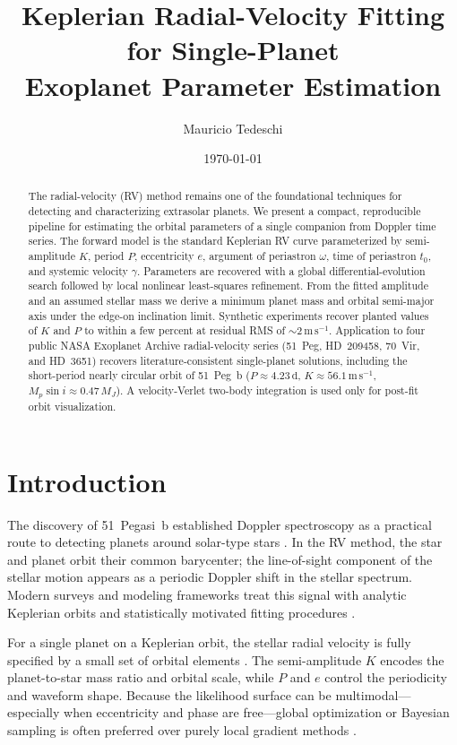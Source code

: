 \documentclass[11pt]{article}
\title{Keplerian Radial-Velocity Fitting for Single-Planet\\
Exoplanet Parameter Estimation}
\author{Mauricio Tedeschi}
\date{\today}
\begin{document}
\maketitle

\begin{abstract}
The radial-velocity (RV) method remains one of the foundational techniques for
detecting and characterizing extrasolar planets. We present a compact,
reproducible pipeline for estimating the orbital parameters of a single
companion from Doppler time series. The forward model is the standard
Keplerian RV curve parameterized by semi-amplitude $K$, period $P$,
eccentricity $e$, argument of periastron $\omega$, time of periastron $t_0$,
and systemic velocity $\gamma$. Parameters are recovered with a global
differential-evolution search followed by local nonlinear least-squares
refinement. From the fitted amplitude and an assumed stellar mass we derive a
minimum planet mass and orbital semi-major axis under the edge-on
inclination limit. Synthetic experiments recover planted values of $K$ and $P$
to within a few percent at residual RMS of $\sim 2\,\mathrm{m\,s^{-1}}$.
Application to four public NASA Exoplanet Archive radial-velocity series (51~Peg, HD~209458, 70~Vir, and HD~3651) recovers literature-consistent single-planet solutions, including the short-period nearly circular orbit of 51~Peg~b ($P \approx 4.23\,\mathrm{d}$, $K \approx 56.1\,\mathrm{m\,s^{-1}}$, $M_p\sin i \approx 0.47\,M_J$). A velocity-Verlet two-body integration is used only for post-fit orbit visualization.
\end{abstract}

\section{Introduction}

The discovery of 51~Pegasi~b established Doppler spectroscopy as a practical
route to detecting planets around solar-type stars
\citep{mayor1995jupiter,marcy1996planet}. In the RV method, the star and
planet orbit their common barycenter; the line-of-sight component of the
stellar motion appears as a periodic Doppler shift in the stellar spectrum.
Modern surveys and modeling frameworks treat this signal with analytic
Keplerian orbits and statistically motivated fitting procedures
\citep{wright2009efficient,cumming2004detectability,fischer2014exoplanet}.

For a single planet on a Keplerian orbit, the stellar radial velocity is fully
specified by a small set of orbital elements
\citep{murray1999solar,murray2010keplerian}. The semi-amplitude $K$ encodes
the planet-to-star mass ratio and orbital scale, while $P$ and $e$ control the
periodicity and waveform shape. Because the likelihood surface can be
multimodal---especially when eccentricity and phase are free---global
optimization or Bayesian sampling is often preferred over purely local
gradient methods \citep{ford2005quantifying,storn1997differential}.
\end{document}
